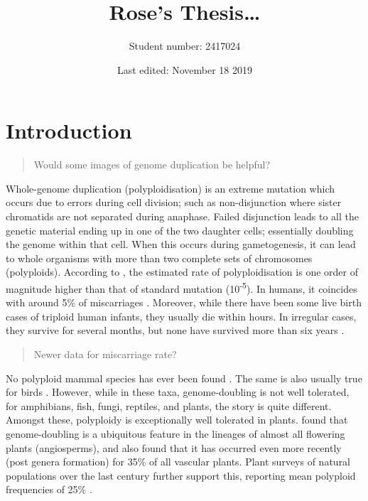 \documentclass[openany, 12pt, draft]{book}
\title{Rose's Thesis\ldots{}}
\author{Student number: 2417024}
\date{Last edited: November 18 2019}
\begin{document}
\maketitle

{
\setcounter{tocdepth}{1}
\tableofcontents
}
\hypertarget{intro}{%
\chapter{Introduction}\label{intro}}

\begin{quote}
Would some images of genome duplication be helpful?
\end{quote}

Whole-genome duplication (polyploidisation) is an extreme mutation which occurs due to errors during cell division; such as non-disjunction where sister chromatids are not separated during anaphase.
Failed disjunction leads to all the genetic material ending up in one of the two daughter cells; essentially doubling the genome within that cell.
When this occurs during gametogenesis, it can lead to whole organisms with more than two complete sets of chromosomes (polyploids).
According to \citet{REFNEEDED}, the estimated rate of polyploidisation is one order of magnitude higher than that of standard mutation (10\textsuperscript{-5}).
In humans, it coincides with around 5\% of miscarriages \citep{Creasy1976}.
Moreover, while there have been some live birth cases of triploid human infants, they usually die within hours.
In irregular cases, they survive for several months, but none have survived more than six years \citep{Hashimoto2018}.

\begin{quote}
Newer data for miscarriage rate?
\end{quote}

No polyploid mammal species has ever been found \citep{Svartman2005}.
The same is also usually true for birds \citep{REFNEEDED}.
However, while in these taxa, genome-doubling is not well tolerated, for amphibians, fish, fungi, reptiles, and plants, the story is quite different.
Amongst these, polyploidy is exceptionally well tolerated in plants.
\citet{Jiao2011} found that genome-doubling is a ubiquitous feature in the lineages of almost all flowering plants (angiosperms), and \citet{Wood2009} also found that it has occurred even more recently (post genera formation) for 35\% of all vascular plants.
Plant surveys of natural populations over the last century further support this, reporting mean polyploid frequencies of 25\% \citep{REFNEEDED}.
\end{document}
